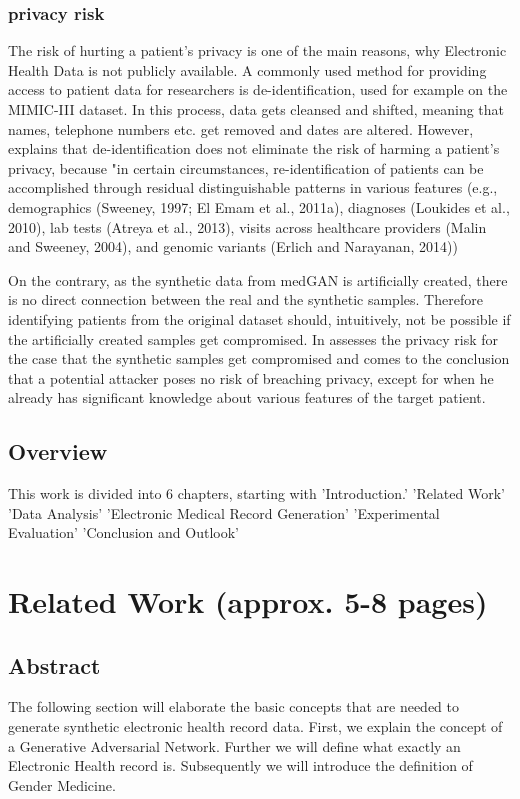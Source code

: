 \documentclass[11pt, a4paper]{book}
\begin{document}
\subsection{privacy risk}
The risk of hurting a patient's privacy is one of the main reasons, why Electronic Health Data is not publicly available. A commonly used method for providing access to patient data for researchers is de-identification, used for example on the MIMIC-III dataset. In this process, data gets cleansed and shifted, meaning that names, telephone numbers etc. get removed and dates are altered. \cite{johnson2016mimic}
However, \cite{Choi2017} explains that de-identification does not eliminate the risk of harming a patient's privacy, because "in certain circumstances, re-identification of patients can be accomplished through residual distinguishable patterns in various features (e.g., demographics (Sweeney, 1997; El Emam et al., 2011a), diagnoses (Loukides et al., 2010), lab tests (Atreya et al., 2013), visits across healthcare providers (Malin and Sweeney, 2004), and genomic variants (Erlich and Narayanan, 2014)) \cite{Choi2017}

On the contrary, as the synthetic data from medGAN is artificially created, there is no direct connection between the real and the synthetic samples. Therefore identifying patients from the original dataset should, intuitively, not be possible if the artificially created samples get compromised. In \cite{Choi2017} assesses the privacy risk for the case that the synthetic samples get compromised and comes to the conclusion that a potential attacker poses no risk of breaching privacy, except for when he already has significant knowledge about various features of the target patient.
\section{Overview}
This work is divided into 6 chapters, starting with 'Introduction.'
'Related Work'
'Data Analysis'
'Electronic Medical Record Generation'
'Experimental Evaluation'
'Conclusion and Outlook'
\chapter{Related Work (approx. 5-8 pages)}
\section{Abstract}
The following section will elaborate the basic concepts that are needed to  generate synthetic electronic health record data.
First, we explain the concept of a Generative Adversarial Network. Further we will define what exactly an Electronic Health record is. Subsequently we will introduce the definition of Gender Medicine.
\end{document}
